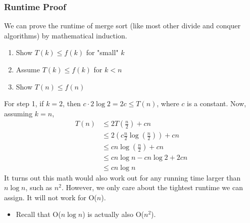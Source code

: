 \documentclass[10pt]{article}
\begin{document}
\subsubsection*{Runtime Proof}
We can prove the runtime of merge sort (like most other divide and conquer algorithms) by mathematical induction. 
\begin{enumerate}
    \item Show $T(k) \leq f(k)$ for "small" $k$
    \item Assume $T(k) \leq f(k)$ for $k < n$
    \item Show $T(n) \leq f(n)$
\end{enumerate}
For step 1, if $k = 2$, then $c \cdot 2 \log 2 = 2c \leq T(n)$, where $c$ is a constant.  Now, assuming $k = n$,
\begin{align*}
    T(n) &\leq 2 T\left(\frac{n}{2}\right) + cn\\
    &\leq 2\left(c \frac{n}{2} \log\left(\frac{n}{2}\right)\right) + cn\\
    &\leq cn \log\left(\frac{n}{2}\right) + cn\\
    &\leq cn \log n - cn \log 2 + 2cn\\
    &\leq cn \log n
\end{align*}
It turns out this math would also work out for any running time larger than $n \log n$, such as $n^2$.  However, we only care about the tightest runtime we can assign.  It will not work for O($n$).
\begin{itemize}
    \item Recall that O($n \log n$) is actually also O($n^2$).
\end{itemize}
\end{document}
